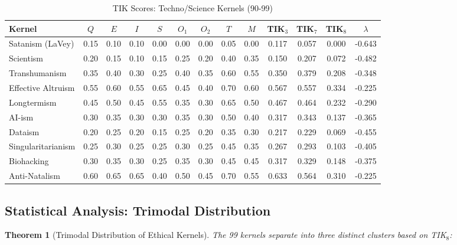 \documentclass[11pt,a4paper]{article}
\newtheorem{theorem}{Theorem}[section]
\theoremstyle{definition}
\theoremstyle{remark}
\begin{document}
\begin{table}[H]
\centering
\caption{TIK Scores: Techno/Science Kernels (90-99)}
\label{tab:tik-techno}
\small
\begin{tabular}{@{}l|ccccccc|c|cccc@{}}
\toprule
\textbf{Kernel} & $Q$ & $E$ & $I$ & $S$ & $O_1$ & $O_2$ & $T$ & $M$ & \textbf{TIK$_3$} & \textbf{TIK$_7$} & \textbf{TIK$_8$} & $\lambda$ \\
\midrule
Satanism (LaVey) & 0.15 & 0.10 & 0.10 & 0.00 & 0.00 & 0.00 & 0.05 & 0.00 & 0.117 & 0.057 & 0.000 & -0.643 \\
Scientism & 0.20 & 0.15 & 0.10 & 0.15 & 0.25 & 0.20 & 0.40 & 0.35 & 0.150 & 0.207 & 0.072 & -0.482 \\
Transhumanism & 0.35 & 0.40 & 0.30 & 0.25 & 0.40 & 0.35 & 0.60 & 0.55 & 0.350 & 0.379 & 0.208 & -0.348 \\
Effective Altruism & 0.55 & 0.60 & 0.55 & 0.65 & 0.45 & 0.40 & 0.70 & 0.60 & 0.567 & 0.557 & 0.334 & -0.225 \\
Longtermism & 0.45 & 0.50 & 0.45 & 0.55 & 0.35 & 0.30 & 0.65 & 0.50 & 0.467 & 0.464 & 0.232 & -0.290 \\
AI-ism & 0.30 & 0.35 & 0.30 & 0.30 & 0.35 & 0.30 & 0.50 & 0.40 & 0.317 & 0.343 & 0.137 & -0.365 \\
Dataism & 0.20 & 0.25 & 0.20 & 0.15 & 0.25 & 0.20 & 0.35 & 0.30 & 0.217 & 0.229 & 0.069 & -0.455 \\
Singularitarianism & 0.25 & 0.30 & 0.25 & 0.25 & 0.30 & 0.25 & 0.45 & 0.35 & 0.267 & 0.293 & 0.103 & -0.405 \\
Biohacking & 0.30 & 0.35 & 0.30 & 0.25 & 0.35 & 0.30 & 0.45 & 0.45 & 0.317 & 0.329 & 0.148 & -0.375 \\
Anti-Natalism & 0.60 & 0.65 & 0.65 & 0.40 & 0.50 & 0.45 & 0.70 & 0.55 & 0.633 & 0.564 & 0.310 & -0.225 \\
\bottomrule
\end{tabular}
\end{table}

\subsection{Statistical Analysis: Trimodal Distribution}

\begin{theorem}[Trimodal Distribution of Ethical Kernels]
\label{thm:trimodal}
The 99 kernels separate into three distinct clusters based on TIK$_8$:
\end{theorem}
\end{document}
